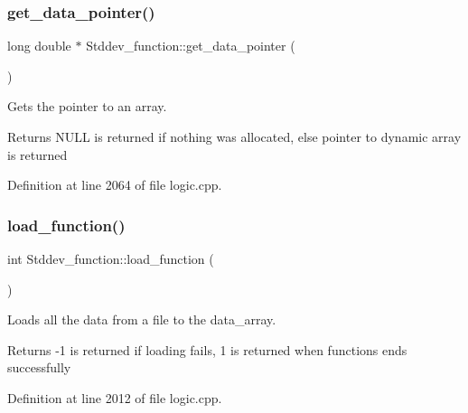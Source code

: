 \subsubsection{\texorpdfstring{get\_data\_pointer()}{get\_data\_pointer()}}
{\footnotesize\ttfamily long double $\ast$ Stddev\+\_\+function\+::get\+\_\+data\+\_\+pointer (\begin{DoxyParamCaption}{ }\end{DoxyParamCaption})}



Gets the pointer to an array. 

\begin{DoxyReturn}{Returns}
N\+U\+LL is returned if nothing was allocated, else pointer to dynamic array is returned 
\end{DoxyReturn}


Definition at line 2064 of file logic.\+cpp.


\begin{DoxyCode}{0}

\end{DoxyCode}
\mbox{\label{class_stddev__function_adbcb1c4380ea74e87448dd77ebbf046f}} 
\subsubsection{\texorpdfstring{load\_function()}{load\_function()}}
{\footnotesize\ttfamily int Stddev\+\_\+function\+::load\+\_\+function (\begin{DoxyParamCaption}{ }\end{DoxyParamCaption})}



Loads all the data from a file to the data\+\_\+array. 

\begin{DoxyReturn}{Returns}
-\/1 is returned if loading fails, 1 is returned when functions ends successfully 
\end{DoxyReturn}


Definition at line 2012 of file logic.\+cpp.


